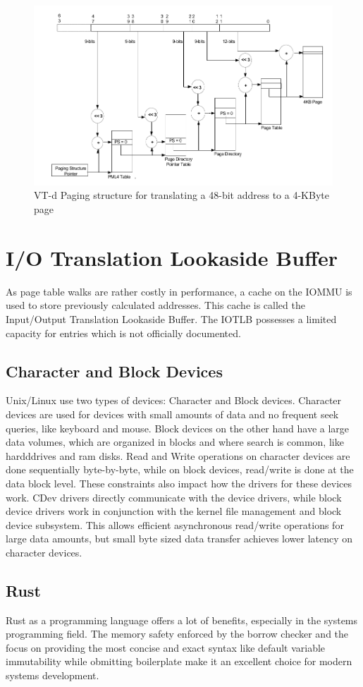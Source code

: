 \begin{figure}
    \centering
    \includegraphics[width=\textwidth]{figures/4kibtranslation.pdf}
    \caption{VT-d Paging structure for translating a 48-bit address to a 4-KByte page}
    \label{fig:pagewalk4kib}
\end{figure}

\section{I/O Translation Lookaside Buffer}
As page table walks are rather costly in performance, a cache on the IOMMU is used to store previously calculated addresses. This cache is called the Input/Output Translation Lookaside Buffer. The IOTLB possesses a limited capacity for entries which is not officially documented.

\subsection{Character and Block Devices}
Unix/Linux use two types of devices: Character and Block devices. Character devices are used for devices with small amounts of data and no frequent seek queries, like keyboard and mouse. Block devices on the other hand have a large data volumes, which are organized in blocks and where search is common, like hardddrives and ram disks.
Read and Write operations on character devices are done sequentially byte-by-byte, while on block devices, read/write is done at the data block level.
These constraints also impact how the drivers for these devices work. CDev drivers directly communicate with the device drivers, while block device drivers work in conjunction with the kernel file management and block device subsystem. This allows efficient asynchronous read/write operations for large data amounts, but small byte sized data transfer achieves lower latency on character devices.

\subsection{Rust}
Rust as a programming language offers a lot of benefits, especially in the systems programming field. The memory safety enforced by the borrow checker and the focus on providing the most concise and exact syntax like default variable immutability while obmitting boilerplate make it an excellent choice for modern systems development.